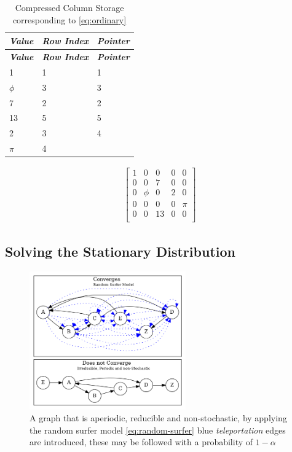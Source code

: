 \documentclass[11pt, twoside]{report}
\begin{document}
\begin{minipage}{0.5\textwidth}
    \hypertarget{table:col-storage}{}
    \begin{longtable}[]{@{}lll@{}}
    \caption{Compressed Column Storage corresponding to
    \label{table:col-storage}
    \eqref{eq:ordinary}}\tabularnewline
    \toprule
    \emph{\textbf{Value}} & \emph{\textbf{Row Index}} &
    \textbf{\emph{Pointer}}\tabularnewline
    \midrule
    \endfirsthead
    \toprule
    \emph{\textbf{Value}} & \emph{\textbf{Row Index}} &
    \textbf{\emph{Pointer}}\tabularnewline
    \midrule
    \endhead
    1 & 1 & 1\tabularnewline
    \(\phi\) & 3 & 3\tabularnewline
    7 & 2 & 2\tabularnewline
    13 & 5 & 5\tabularnewline
    2 & 3 & 4\tabularnewline
    \(\pi\) & 4 &\tabularnewline
    \bottomrule
    \end{longtable}
\end{minipage}
\begin{minipage}{0.5\textwidth}
    \begin{align}
        \begin{bmatrix}
        1 & 0 & 0 & 0 & 0 \\
        0 & 0 & 7 & 0 & 0 \\
        0 & \phi & 0 & 2 & 0 \\
        0 & 0 & 0 & 0 & \pi \\
        0 & 0 & 13 & 0 & 0 \\
        \end{bmatrix}  \label{eq:ordinary}
    \end{align}
\end{minipage}



\subsection{Solving the Stationary Distribution}
\label{solving-stationary-dist}

 \begin{figure}
 \includegraphics[width=0.6\textwidth]{media/dot/random_surfer.dot.png}
 \caption{\label{fig:rseg}A graph that is aperiodic, reducible and non-stochastic, by applying the random surfer model \eqref{eq:random-surfer} blue \emph{teleportation} edges are introduced, these may be followed with a probability of \(1 - \alpha\)}
 \end{figure}
\end{document}
